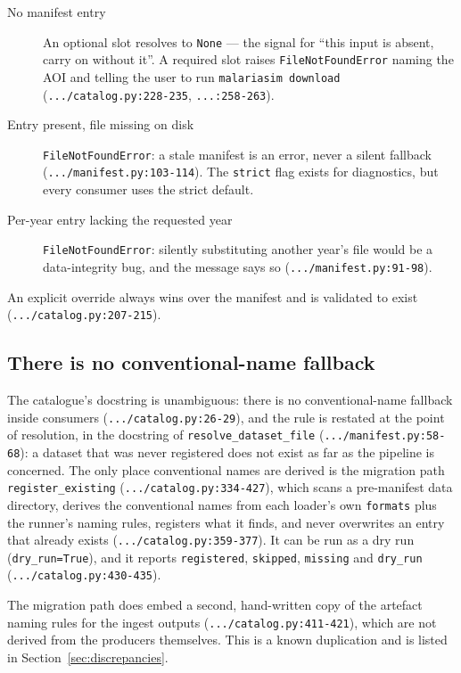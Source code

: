 \documentclass[11pt,a4paper]{article}
\newcommand{\code}[1]{\texttt{#1}}
\begin{document}
\begin{description}
\item[No manifest entry] An optional slot resolves to \code{None} --- the
signal for ``this input is absent, carry on without it''. A required slot
raises \code{FileNotFoundError} naming the AOI and telling the user to run
\code{malariasim download} (\code{.../catalog.py:228-235},
\code{...:258-263}).
\item[Entry present, file missing on disk] \code{FileNotFoundError}: a stale
manifest is an error, never a silent fallback (\code{.../manifest.py:103-114}).
The \code{strict} flag exists for diagnostics, but every consumer uses the
strict default.
\item[Per-year entry lacking the requested year] \code{FileNotFoundError}:
silently substituting another year's file would be a data-integrity bug, and
the message says so (\code{.../manifest.py:91-98}).
\end{description}

An explicit override always wins over the manifest and is validated to exist
(\code{.../catalog.py:207-215}).

\subsection{There is no conventional-name fallback}

The catalogue's docstring is unambiguous: there is no conventional-name
fallback inside consumers (\code{.../catalog.py:26-29}), and the rule is
restated at the point of resolution, in the docstring of
\code{resolve\_dataset\_file}
(\code{.../manifest.py:58-68}): a dataset that was never registered does not
exist as far as the pipeline is concerned. The only place conventional names are
derived is the migration path \code{register\_existing}
(\code{.../catalog.py:334-427}), which scans a pre-manifest data directory,
derives the conventional names from each loader's own \code{formats} plus the
runner's naming rules, registers what it finds, and never overwrites an entry
that already exists (\code{.../catalog.py:359-377}). It can be run as a dry
run (\code{dry\_run=True}), and it reports \code{registered}, \code{skipped},
\code{missing} and \code{dry\_run}
(\code{.../catalog.py:430-435}).

The migration path does embed a second, hand-written copy of the artefact
naming rules for the ingest outputs
(\code{.../catalog.py:411-421}), which are not derived from the producers
themselves. This is a known duplication and is listed in
Section~\ref{sec:discrepancies}.
\end{document}
